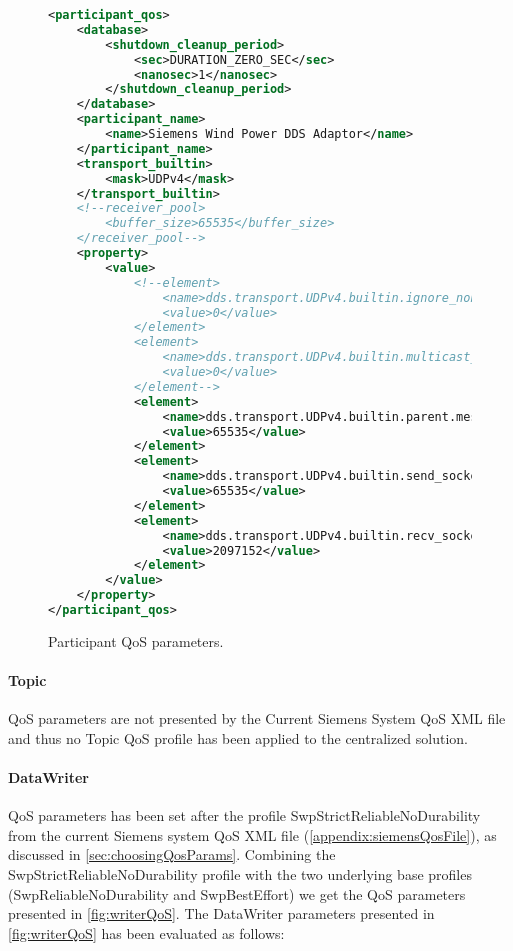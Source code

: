 \begin{figure}
\begin{lstlisting}[language=XML]
<participant_qos>
	<database>
		<shutdown_cleanup_period>
			<sec>DURATION_ZERO_SEC</sec>
			<nanosec>1</nanosec>
		</shutdown_cleanup_period>
	</database>
	<participant_name>
		<name>Siemens Wind Power DDS Adaptor</name>
	</participant_name>
	<transport_builtin>
		<mask>UDPv4</mask>
	</transport_builtin>
	<!--receiver_pool>
		<buffer_size>65535</buffer_size>
	</receiver_pool-->
	<property>
		<value>
			<!--element>
				<name>dds.transport.UDPv4.builtin.ignore_nonup_interfaces</name>
				<value>0</value>
			</element>
			<element>
				<name>dds.transport.UDPv4.builtin.multicast_enabled</name>
				<value>0</value>
			</element-->
			<element>
				<name>dds.transport.UDPv4.builtin.parent.message_size_max</name>
				<value>65535</value>
			</element>
			<element>
				<name>dds.transport.UDPv4.builtin.send_socket_buffer_size</name>
				<value>65535</value>
			</element>
			<element>
				<name>dds.transport.UDPv4.builtin.recv_socket_buffer_size</name>
				<value>2097152</value>
			</element>
		</value>
	</property>
</participant_qos>
\end{lstlisting}
\caption[Participant QoS parameters]{
		\label{fig:parQos} 
		\footnotesize{Participant QoS parameters.}
	}
\end{figure}

\FloatBarrier

\paragraph{Topic} QoS parameters are not presented by the Current Siemens System QoS XML file and thus no Topic QoS profile has been applied to the centralized solution. 

\paragraph{DataWriter} QoS parameters has been set after the profile SwpStrictReliableNoDurability from the current Siemens system QoS XML file (\cref{appendix:siemensQosFile}), as discussed in \cref{sec:choosingQosParams}. Combining the SwpStrictReliableNoDurability profile with the two underlying base profiles (SwpReliableNoDurability and SwpBestEffort) we get the QoS parameters presented in \cref{fig:writerQoS}. The DataWriter parameters presented in \cref{fig:writerQoS} has been evaluated as follows:

